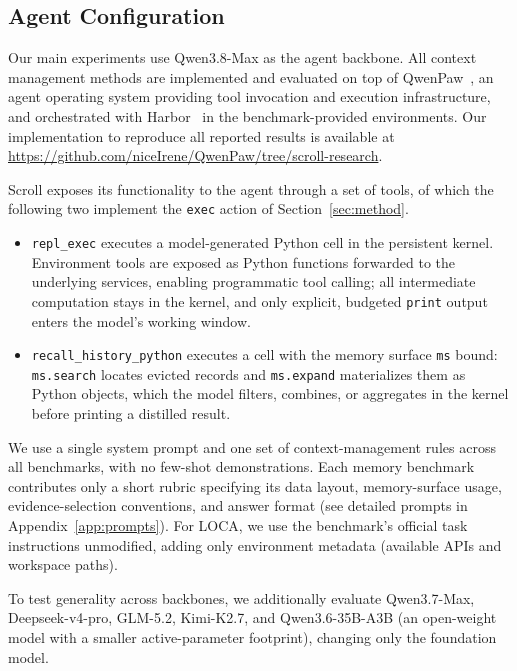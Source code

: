 \subsection{Agent Configuration}
\label{sec:setup-agent}

Our main experiments use Qwen3.8-Max as the agent backbone. All context management methods are implemented and evaluated on top of QwenPaw~\citep{qwenpaw}, an agent operating system providing tool invocation and execution infrastructure, and orchestrated with Harbor~\citep{harbor} in the benchmark-provided environments. Our implementation to reproduce all reported results is available at \url{https://github.com/niceIrene/QwenPaw/tree/scroll-research}.

Scroll exposes its functionality to the agent through a set of tools, of which the following two implement the \texttt{exec} action of Section~\ref{sec:method}.

\begin{itemize}[leftmargin=1.4em,itemsep=1pt,topsep=2pt]
    \item \texttt{repl\_exec} executes a model-generated Python cell in the persistent kernel. Environment tools are exposed as Python functions forwarded to the underlying services, enabling programmatic tool calling; all intermediate computation stays in the kernel, and only explicit, budgeted \texttt{print} output enters the model's working window.
    \item \texttt{recall\_history\_python} executes a cell with the memory surface \texttt{ms} bound: \texttt{ms.search} locates evicted records and \texttt{ms.expand} materializes them as Python objects, which the model filters, combines, or aggregates in the kernel before printing a distilled result.
\end{itemize}


We use a single system prompt and one set of context-management rules across all benchmarks, with no few-shot demonstrations. Each memory benchmark contributes only a short rubric specifying its data layout, memory-surface usage, evidence-selection conventions, and answer format (see detailed prompts in Appendix~\ref{app:prompts}). For LOCA, we use the benchmark's official task instructions unmodified, adding only environment metadata (available APIs and workspace paths). 

To test generality across backbones, we additionally evaluate Qwen3.7-Max, Deepseek-v4-pro, GLM-5.2, Kimi-K2.7, and Qwen3.6-35B-A3B (an open-weight model with a smaller active-parameter footprint), changing only the foundation model.


